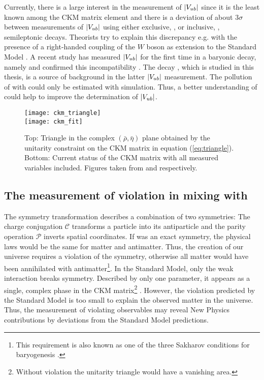 Currently, there is a large interest in the measurement of $|{V_{{u}{b}}}|$ since it is the least known among the CKM matrix element and there is a deviation of about $3\sigma$ between measurements of $|{V_{{u}{b}}}|$ using either exclusive, \decay{\B}{\pi\ell\neul}, or inclusive, , semileptonic decays.
Theorists try to explain this discrepancy e.g. with the presence of a right-handed coupling of the $W$ boson as extension to the Standard Model \cite{Vub_RightHanded}.
A recent \lhcb study has measured $|{V_{{u}{b}}}|$ for the first time in a baryonic decay, namely \decay{\Lb}{\proton\mun\neumb} and confirmed this incompatibility \cite{SL_Vub}.
The decay \LbToDpmunuX, which is studied in this thesis, is a source of background in the latter $|{V_{{u}{b}}}|$ measurement.
The pollution of \decay{\Lb}{\proton\mun\neumb} with \LbToDpmunuX could only be estimated with simulation.
Thus, a better understanding of \LbToDpmunuX could help to improve the determination of $|{V_{{u}{b}}}|$.
\begin{figure}[tb]
    \centering
	\texttt{[image: ckm\_triangle]} \\	
	\texttt{[image: ckm\_fit]}	
	\caption{Top: Triangle in the complex $(\bar{\rho}, \bar{\eta})$ plane obtained by the unitarity constraint on the CKM matrix in equation (\ref{eq:triangle}). Bottom: Current status of the CKM matrix with all measured variables included. Figures taken from \cite{PDG} and \cite{CKM_fitter}
    respectively.}
	\label{fig:CKM_triangle}
\end{figure}

\subsection{The measurement of \CP violation in mixing with \asld}
The symmetry transformation \CP describes a combination of two symmetries:
The charge conjugation $\mathcal{C}$ transforms a particle into its antiparticle and the parity operation $\mathcal{P}$ inverts spatial coordinates.
If \CP was an exact symmetry, the physical laws would be the same for matter and antimatter.
Thus, the creation of our universe requires a violation of the \CP symmetry, otherwise all matter would have been annihilated with antimatter\footnote{This requirement is also known as one of the three Sakharov conditions for baryogenesis \cite{Sakharov}.}.
In the Standard Model, only the weak interaction breaks \CP symmetry.
Described by only one parameter, it appears as a single, complex phase in the CKM matrix\footnote{Without \CP violation the unitarity triangle would have a vanishing area.} \cite{Kobayashi_CKM}.
However, the \CP violation predicted by the Standard Model is too small to explain the observed matter in the universe.
Thus, the measurement of \CP violating observables may reveal New Physics contributions by deviations from the Standard Model predictions.

